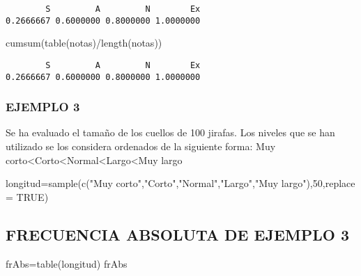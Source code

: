 \documentclass[
]{article}
\newenvironment{Shaded}{\begin{snugshade}}{\end{snugshade}}
\newcommand{\AttributeTok}[1]{\textcolor[rgb]{0.77,0.63,0.00}{#1}}
\newcommand{\ConstantTok}[1]{\textcolor[rgb]{0.00,0.00,0.00}{#1}}
\newcommand{\DecValTok}[1]{\textcolor[rgb]{0.00,0.00,0.81}{#1}}
\newcommand{\FunctionTok}[1]{\textcolor[rgb]{0.00,0.00,0.00}{#1}}
\newcommand{\NormalTok}[1]{#1}
\newcommand{\OtherTok}[1]{\textcolor[rgb]{0.56,0.35,0.01}{#1}}
\newcommand{\SpecialCharTok}[1]{\textcolor[rgb]{0.00,0.00,0.00}{#1}}
\newcommand{\StringTok}[1]{\textcolor[rgb]{0.31,0.60,0.02}{#1}}
\begin{document}
\begin{verbatim}
        S         A         N        Ex 
0.2666667 0.6000000 0.8000000 1.0000000 
\end{verbatim}

\begin{Shaded}
\begin{Highlighting}[]
\FunctionTok{cumsum}\NormalTok{(}\FunctionTok{table}\NormalTok{(notas)}\SpecialCharTok{/}\FunctionTok{length}\NormalTok{(notas))}
\end{Highlighting}
\end{Shaded}

\begin{verbatim}
        S         A         N        Ex 
0.2666667 0.6000000 0.8000000 1.0000000 
\end{verbatim}

\hypertarget{ejemplo-3}{%
\subsubsection{EJEMPLO 3}\label{ejemplo-3}}

Se ha evaluado el tamaño de los cuellos de 100 jirafas. Los niveles que
se han utilizado se los considera ordenados de la siguiente forma: Muy
corto\textless Corto\textless Normal\textless Largo\textless Muy largo

\begin{Shaded}
\begin{Highlighting}[]
\NormalTok{longitud}\OtherTok{=}\FunctionTok{sample}\NormalTok{(}\FunctionTok{c}\NormalTok{(}\StringTok{"Muy corto"}\NormalTok{,}\StringTok{"Corto"}\NormalTok{,}\StringTok{"Normal"}\NormalTok{,}\StringTok{"Largo"}\NormalTok{,}\StringTok{"Muy largo"}\NormalTok{),}\DecValTok{50}\NormalTok{,}\AttributeTok{replace =} \ConstantTok{TRUE}\NormalTok{)}
\end{Highlighting}
\end{Shaded}

\hypertarget{frecuencia-absoluta-de-ejemplo-3}{%
\subsection{FRECUENCIA ABSOLUTA DE EJEMPLO
3}\label{frecuencia-absoluta-de-ejemplo-3}}

\begin{Shaded}
\begin{Highlighting}[]
\NormalTok{frAbs}\OtherTok{=}\FunctionTok{table}\NormalTok{(longitud)}
\NormalTok{frAbs}
\end{Highlighting}
\end{Shaded}
\end{document}
